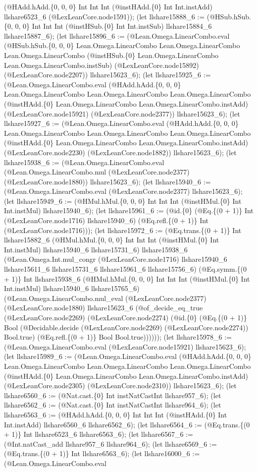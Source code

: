 \documentclass[11pt]{article}
\begin{document}
(@HAdd.hAdd.\{0, 0, 0\} Int Int Int (@instHAdd.\{0\} Int Int.instAdd) llshare6523\_6 (@LexLeanCore.node1591)); (let llshare15888\_6 := (@HSub.hSub.\{0, 0, 0\} Int Int Int (@instHSub.\{0\} Int Int.instSub) llshare15884\_6 llshare15887\_6); (let llshare15896\_6 := (@Lean.Omega.LinearCombo.eval (@HSub.hSub.\{0, 0, 0\} Lean.Omega.LinearCombo Lean.Omega.LinearCombo Lean.Omega.LinearCombo (@instHSub.\{0\} Lean.Omega.LinearCombo Lean.Omega.LinearCombo.instSub) (@LexLeanCore.node15892) (@LexLeanCore.node2207)) llshare15623\_6); (let llshare15925\_6 := (@Lean.Omega.LinearCombo.eval (@HAdd.hAdd.\{0, 0, 0\} Lean.Omega.LinearCombo Lean.Omega.LinearCombo Lean.Omega.LinearCombo (@instHAdd.\{0\} Lean.Omega.LinearCombo Lean.Omega.LinearCombo.instAdd) (@LexLeanCore.node15921) (@LexLeanCore.node2377)) llshare15623\_6); (let llshare15927\_6 := (@Lean.Omega.LinearCombo.eval (@HAdd.hAdd.\{0, 0, 0\} Lean.Omega.LinearCombo Lean.Omega.LinearCombo Lean.Omega.LinearCombo (@instHAdd.\{0\} Lean.Omega.LinearCombo Lean.Omega.LinearCombo.instAdd) (@LexLeanCore.node2230) (@LexLeanCore.node1882)) llshare15623\_6); (let llshare15938\_6 := (@Lean.Omega.LinearCombo.eval (@Lean.Omega.LinearCombo.mul (@LexLeanCore.node2377) (@LexLeanCore.node1880)) llshare15623\_6); (let llshare15940\_6 := (@Lean.Omega.LinearCombo.eval (@LexLeanCore.node2377) llshare15623\_6); (let llshare15949\_6 := (@HMul.hMul.\{0, 0, 0\} Int Int Int (@instHMul.\{0\} Int Int.instMul) llshare15940\_6); (let llshare15961\_6 := (@id.\{0\} (@Eq.\{(0 + 1)\} Int (@LexLeanCore.node1716) llshare15940\_6) (@Eq.refl.\{(0 + 1)\} Int (@LexLeanCore.node1716))); (let llshare15972\_6 := (@Eq.trans.\{(0 + 1)\} Int llshare15882\_6 (@HMul.hMul.\{0, 0, 0\} Int Int Int (@instHMul.\{0\} Int Int.instMul) llshare15940\_6 llshare15731\_6) llshare15938\_6 (@Lean.Omega.Int.mul\_congr (@LexLeanCore.node1716) llshare15940\_6 llshare15611\_6 llshare15731\_6 llshare15961\_6 llshare15756\_6) (@Eq.symm.\{(0 + 1)\} Int llshare15938\_6 (@HMul.hMul.\{0, 0, 0\} Int Int Int (@instHMul.\{0\} Int Int.instMul) llshare15940\_6 llshare15765\_6) (@Lean.Omega.LinearCombo.mul\_eval (@LexLeanCore.node2377) (@LexLeanCore.node1880) llshare15623\_6 (@of\_decide\_eq\_true (@LexLeanCore.node2269) (@LexLeanCore.node2274) (@id.\{0\} (@Eq.\{(0 + 1)\} Bool (@Decidable.decide (@LexLeanCore.node2269) (@LexLeanCore.node2274)) Bool.true) (@Eq.refl.\{(0 + 1)\} Bool Bool.true)))))); (let llshare15978\_6 := (@Lean.Omega.LinearCombo.eval (@LexLeanCore.node15921) llshare15623\_6); (let llshare15989\_6 := (@Lean.Omega.LinearCombo.eval (@HAdd.hAdd.\{0, 0, 0\} Lean.Omega.LinearCombo Lean.Omega.LinearCombo Lean.Omega.LinearCombo (@instHAdd.\{0\} Lean.Omega.LinearCombo Lean.Omega.LinearCombo.instAdd) (@LexLeanCore.node2305) (@LexLeanCore.node2310)) llshare15623\_6); (let llshare6560\_6 := (@Nat.cast.\{0\} Int instNatCastInt llshare957\_6); (let llshare6562\_6 := (@Nat.cast.\{0\} Int instNatCastInt llshare964\_6); (let llshare6563\_6 := (@HAdd.hAdd.\{0, 0, 0\} Int Int Int (@instHAdd.\{0\} Int Int.instAdd) llshare6560\_6 llshare6562\_6); (let llshare6564\_6 := (@Eq.trans.\{(0 + 1)\} Int llshare6523\_6 llshare6563\_6); (let llshare6567\_6 := (@Int.natCast\_add llshare957\_6 llshare964\_6); (let llshare6569\_6 := (@Eq.trans.\{(0 + 1)\} Int llshare6563\_6); (let llshare16000\_6 := (@Lean.Omega.LinearCombo.eval 
\end{document}
